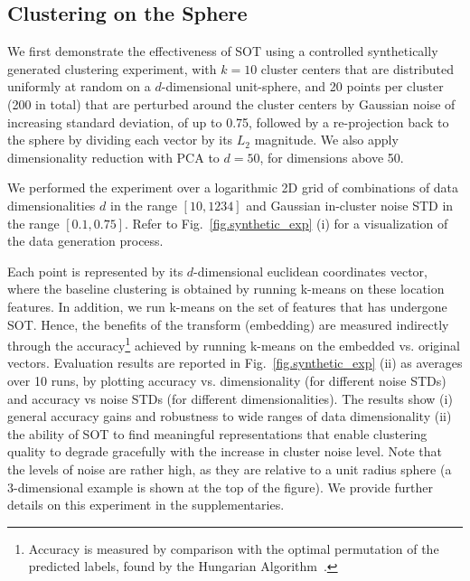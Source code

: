 \subsection{Clustering on the Sphere}
We first demonstrate the effectiveness of SOT using a controlled synthetically generated clustering experiment, with $k=10$ cluster centers that are distributed uniformly at random on a $d$-dimensional unit-sphere, and 20  points per cluster (200 in total) that are perturbed around the cluster centers by Gaussian noise of increasing standard deviation, of up to 0.75, followed by a re-projection back to the sphere by dividing each vector by its $L_2$ magnitude. We also apply dimensionality reduction with PCA to $d=50$, for dimensions above 50.

We performed the experiment over a logarithmic 2D grid of combinations of data dimensionalities $d$ in the range $[10, 1234]$ and Gaussian in-cluster noise STD in the range $[0.1,0.75]$. Refer to Fig.~\ref{fig.synthetic_exp} (i) for a visualization of the data generation process. 

Each point is represented by its $d$-dimensional euclidean coordinates vector, where the baseline clustering is obtained by running k-means on these location features. In addition, we run k-means on the set of features that has undergone SOT. Hence, the benefits of the transform (embedding) are measured indirectly through the accuracy\footnote{Accuracy is measured by comparison with the optimal permutation of the predicted labels, found by the Hungarian Algorithm~\cite{kuhn1955hungarian}.} achieved by running k-means on the embedded vs. original vectors.
Evaluation results are reported in Fig.~\ref{fig.synthetic_exp} (ii) as averages over 10 runs, by plotting accuracy vs. dimensionality (for different noise STDs) and accuracy vs noise STDs (for different dimensionalities). The results show (i) general accuracy gains and robustness to wide ranges of data dimensionality (ii) the ability of SOT to find meaningful representations that enable clustering quality to degrade gracefully with the increase in cluster noise level. Note that the levels of noise are rather high, as they are relative to a unit radius sphere (a 3-dimensional example is shown at the top of the figure). We provide further details on this experiment in the supplementaries.

